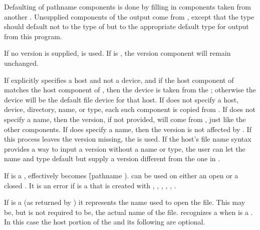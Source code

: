 Defaulting of pathname components is done by filling in components taken
from another .  Unsupplied components of the output
 come from , except that the type should
default not to the type of  but to the appropriate default type
for output from this program.

If no version is supplied,  is used.
If  is \nil, the version component will remain unchanged.

If  explicitly specifies a host and not a device, and 
if the host component of  matches the host component
of , then the device is taken from the ;
otherwise the device will be the default file device for that host.  If
 does not specify a host, device, directory, name,
or type, each such component is copied from .
If  does not specify a name, then the version, if not provided, will
come from , just like the other components.  If
 does specify a name, then the version is not affected
by . If this process leaves the
version missing, the  is used.
If the host's file name syntax provides a way
to input a version without a name or type, the user can let the name
and type default but supply a version different from the one in .

If  is a ,  effectively
becomes \f{(pathname )}. 
can be used on either an open or a closed .
It is an error if  is a  that is 
created with , 
,
, 
, ,
.

If  is a  (as returned by )
it represents the name used to open the file. This may be, but is
not required to be, the actual name of the file. 
 recognizes a 
  when  is a 
.  In this case the host portion of the 
  and its following  are optional.

